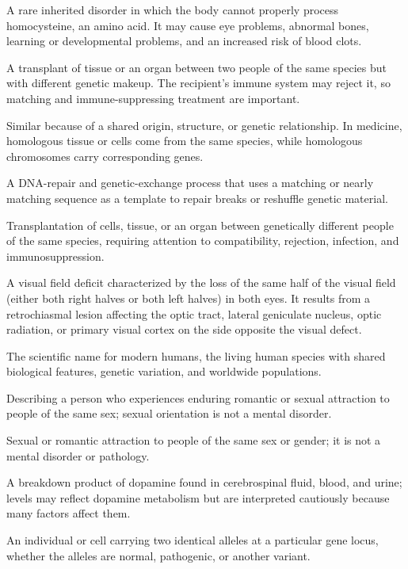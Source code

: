  A rare inherited disorder in which the body cannot properly process homocysteine, an amino acid. It may cause eye problems, abnormal bones, learning or developmental problems, and an increased risk of blood clots.

 A transplant of tissue or an organ between two people of the same species but with different genetic makeup. The recipient’s immune system may reject it, so matching and immune-suppressing treatment are important.

 Similar because of a shared origin, structure, or genetic relationship. In medicine, homologous tissue or cells come from the same species, while homologous chromosomes carry corresponding genes.

 A DNA-repair and genetic-exchange process that uses a matching or nearly matching sequence as a template to repair breaks or reshuffle genetic material.

 Transplantation of cells, tissue, or an organ between genetically different people of the same species, requiring attention to compatibility, rejection, infection, and immunosuppression.

 A visual field deficit characterized by the loss of the same half of the visual field (either both right halves or both left halves) in both eyes. It results from a retrochiasmal lesion affecting the optic tract, lateral geniculate nucleus, optic radiation, or primary visual cortex on the side opposite the visual defect.

 The scientific name for modern humans, the living human species with shared biological features, genetic variation, and worldwide populations.

 Describing a person who experiences enduring romantic or sexual attraction to people of the same sex; sexual orientation is not a mental disorder.

 Sexual or romantic attraction to people of the same sex or gender; it is not a mental disorder or pathology.

 A breakdown product of dopamine found in cerebrospinal fluid, blood, and urine; levels may reflect dopamine metabolism but are interpreted cautiously because many factors affect them.

 An individual or cell carrying two identical alleles at a particular gene locus, whether the alleles are normal, pathogenic, or another variant.

